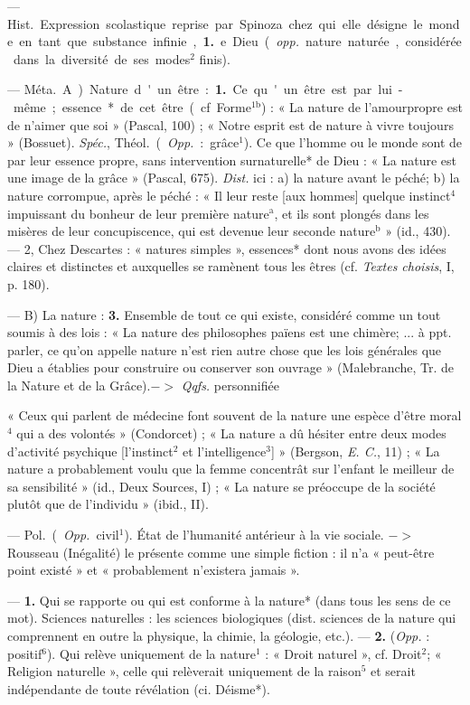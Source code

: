 \begin{itemize}[leftmargin=1cm, label=, itemsep=1pt]
 — \si{Hist.} Expression scolastique reprise par Spinoza
chez qui elle désigne le monde en
tant que substance infinie, {\bf 1.} e. Dieu
({\it opp.} nature naturée, considérée dans
la diversité de ses modes$^2$ finis).

 — \si{Méta.} A) Nature d'un
être : {\bf 1.} Ce qu'un être est par lui-même ; essence* de cet être (cf.
Forme$^\text{1b}$) : « La nature de l’amourpropre est de n’aimer que soi »
(Pascal, 100) ; « Notre esprit est de
nature à vivre toujours » (Bossuet).
{\it Spéc.}, \si{Théol.} ({\it Opp.} : grâce$^1$). Ce que
l’homme ou le monde sont de par
leur essence propre, sans intervention surnaturelle* de Dieu : « La
nature est une image de la grâce »
(Pascal, 675). {\it Dist.} ici : a) la nature
avant le péché; b) la nature corrompue, après le péché : « Il leur
reste [aux hommes] quelque instinct$^4$ impuissant du bonheur de
leur première nature$^\text{a}$, et ils sont
plongés dans les misères de leur
concupiscence, qui est devenue leur
seconde nature$^\text{b}$ » (id., 430). — 2,
Chez Descartes : « natures simples »,
essences* dont nous avons des idées
claires et distinctes et auxquelles
se ramènent tous les êtres (cf.
{\it Textes choisis}, I, p. 180).

— B) La nature : {\bf 3.} Ensemble de
tout ce qui existe, considéré comme
un tout soumis à des lois : « La
nature des philosophes païens est
une chimère; ... à ppt. parler, ce
qu’on appelle nature n’est rien
autre chose que les lois générales
que Dieu a établies pour construire
ou conserver son ouvrage » (Malebranche, Tr. de la Nature et de la
Grâce).$->$ {\it Qqfs.} personnifiée

« Ceux qui parlent de médecine
font souvent de la nature une espèce
d'être moral$^4$ qui a des volontés »
(Condorcet) ; « La nature a dû hésiter
entre deux modes d'activité psychique [l’instinct$^2$ et l'intelligence$^3$] »
(Bergson, {\it E. C.}, 11) ; « La nature
a probablement voulu que la femme
concentrât sur l'enfant le meilleur
de sa sensibilité » (id., Deux Sources,
I) ; « La nature se préoccupe de la
société plutôt que de l'individu »
(ibid., II).

 — \si{Pol.} ({\it Opp.}
civil$^1$). État de l'humanité antérieur
à la vie sociale. $->$ Rousseau (Inégalité) le présente comme une simple
fiction : il n'a « peut-être point
existé » et « probablement n’existera
jamais ».

 — {\bf 1.} Qui se rapporte ou qui
est conforme à la nature* (dans
tous les sens de ce mot). Sciences
naturelles : les sciences biologiques
(dist. sciences de la nature qui comprennent en outre la physique, la
chimie, la géologie, etc.). — {\bf 2.} ({\it Opp.} :
positif$^6$). Qui relève uniquement de
la nature$^1$ : « Droit naturel », cf.
Droit$^2$; « Religion naturelle », celle
qui relèverait uniquement de la
raison$^5$ et serait indépendante de
toute révélation (ci. Déisme*).


\end{itemize}
